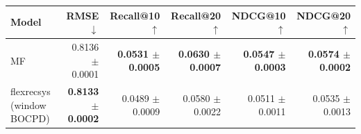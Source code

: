 \begin{tabular}{lrrrrr}
\toprule
Model & RMSE $\downarrow$ & Recall@10 $\uparrow$ & Recall@20 $\uparrow$ & NDCG@10 $\uparrow$ & NDCG@20 $\uparrow$ \\
\midrule
MF & 0.8136 $\pm$ 0.0001 & \textbf{0.0531 $\pm$ 0.0005} & \textbf{0.0630 $\pm$ 0.0007} & \textbf{0.0547 $\pm$ 0.0003} & \textbf{0.0574 $\pm$ 0.0002} \\
flexrecsys (window BOCPD) & \textbf{0.8133 $\pm$ 0.0002} & 0.0489 $\pm$ 0.0009 & 0.0580 $\pm$ 0.0022 & 0.0511 $\pm$ 0.0011 & 0.0535 $\pm$ 0.0013 \\
\bottomrule
\end{tabular}
